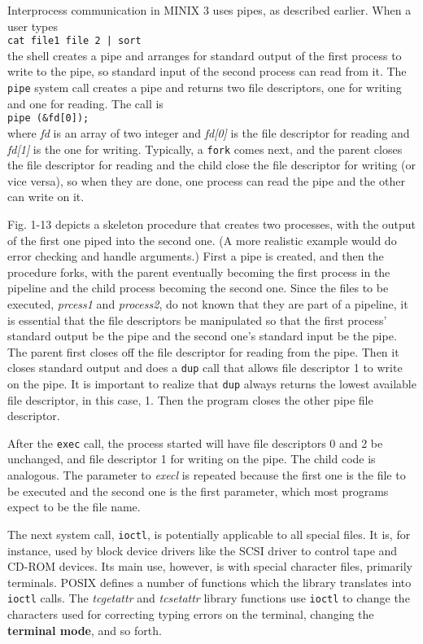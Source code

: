 \documentclass{book}
\newcommand {\kw}  [1] {\textbf{#1}}
\newcommand {\sys} [1] {\textsl{#1}}
\newcommand {\cmd} [1] {\texttt{#1}}
\begin{document}
Interprocess communication in MINIX 3 uses pipes, as described earlier.
When a user types\\
\cmd{cat file1 file 2 | sort}\\
the shell creates a pipe and arranges for standard output of the first process to write to the pipe,
so standard input of the second process can read from it.
The \cmd{pipe} system call creates a pipe and returns two file descriptors, one for writing and one for reading.
The call is\\
\cmd{pipe (\&fd[0]);}\\
where \sys{fd} is an array of two integer and \sys{fd[0]} is the file descriptor for reading and \sys{fd[1]} is the one for writing.
Typically, a \cmd{fork} comes next, and the parent closes the file descriptor for reading 
and the child close the file descriptor for writing (or vice versa),
so when they are done, one process can read the pipe and the other can write on it.

Fig. 1-13 depicts a skeleton procedure that creates two processes, with the output of the first one piped into the second one.
(A more realistic example would do error checking and handle arguments.)
First a pipe is created, and then the procedure forks, with the parent eventually becoming the first process in the pipeline 
and the child process becoming the second one.
Since the files to be executed, \sys{prcess1} and \sys{process2}, do not known  that they are part of a pipeline, 
it is essential that the file descriptors be manipulated so that the first process' standard output be the pipe 
and the second one's standard input be the pipe.
The parent first closes off the file descriptor for reading from the pipe.
Then it closes standard output and does a \cmd{dup} call that allows file descriptor 1 to write on the pipe.
It is important to realize that \cmd{dup} always returns the lowest available file descriptor, in this case, 1.
Then the program closes the other pipe file descriptor.

After the \cmd{exec} call, the process started will have file descriptors 0 and 2 be unchanged, 
and file descriptor 1 for writing on the pipe.
The child code is analogous.
The parameter to \sys{execl} is repeated because the first one is the file to be executed and the second one is the first parameter, 
which most programs expect to be the file name.

The next system call, \cmd{ioctl}, is potentially applicable to all special files.
It is, for instance, used by block device drivers like the SCSI driver to control tape and CD-ROM devices.
Its main use, however, is with special character files, primarily terminals.
POSIX defines a number of functions which the library translates into \cmd{ioctl} calls.
The \sys{tcgetattr} and \sys{tcsetattr} library functions use \cmd{ioctl} to change the characters used for 
correcting typing errors on the terminal, changing the \kw{terminal mode}, and so forth.
\end{document}

